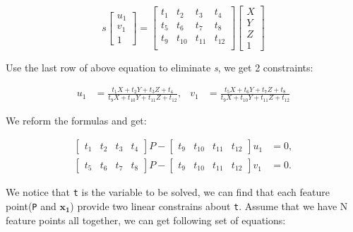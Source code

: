 \begin{equation}
 s \begin{bmatrix} u_1 \\ v_1 \\ 1 \end{bmatrix}
  =
    \begin{bmatrix} t_1 & t_2 & t_3 & t_4 \\
                    t_5 & t_6 & t_7 & t_8 \\
                    t_9 & t_{10} & t_{11} & t_{12} \\ \end{bmatrix}                 
    \begin{bmatrix} X \\ Y \\ Z \\ 1 \end{bmatrix}                  
\end{equation}

Use the last row of above equation to eliminate \textit{s}, we get 2 constraints:

\begin{align}
 u_1 &= \frac{t_1X + t_2Y + t_3Z + t_4}{t_9X + t_{10}Y + t_{11}Z + t_{12}}, & 
 v_1 &= \frac{t_5X + t_6Y + t_7Z + t_8}{t_9X + t_{10}Y + t_{11}Z + t_{12}}              
\end{align}

We reform the formulas and get:

\begin{align*}
 \begin{bmatrix} t_1 & t_2 & t_3 & t_4 \end{bmatrix} P -
 \begin{bmatrix} t_9 & t_{10} & t_{11} & t_{12} \end{bmatrix} u_1 &= 0,\\
 \begin{bmatrix} t_5 & t_6 & t_7 & t_8 \end{bmatrix} P -
 \begin{bmatrix} t_9 & t_{10} & t_{11} & t_{12} \end{bmatrix} v_1 &= 0.         
\end{align*}

We notice that \texttt{t} is the variable to be solved, we can find that each feature 
point(\texttt{P} and $\boldsymbol{x_1}$) provide two linear constrains about \texttt{t}.
Assume that we have N feature points all together, we can get following set of equations:

